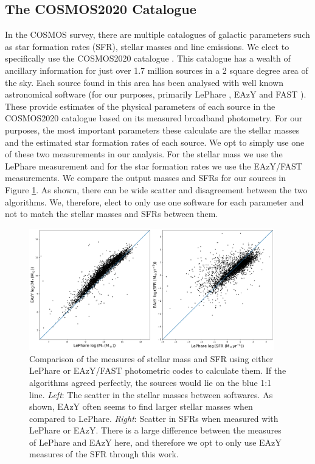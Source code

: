 \subsection{The COSMOS2020 Catalogue}
In the COSMOS survey, there are multiple catalogues of galactic parameters such as star formation rates (SFR), stellar masses and line emissions. We elect to specifically use the COSMOS2020 catalogue \citep{2022ApJS..258...11W}. This catalogue has a wealth of ancillary information for just over 1.7 million sources in a 2 square degree area of the sky. Each source found in this area has been analysed with well known astronomical software (for our purposes, primarily  LePhare \citep{1999MNRAS.310..540A, 2006A&A...457..841I}, EAzY \citep{2008ApJ...686.1503B} and FAST \citep{2017MNRAS.465.3390A}). These provide estimates of the physical parameters of each source in the COSMOS2020 catalogue based on its measured broadband photometry. For our purposes, the most important parameters these calculate are the stellar masses and the estimated star formation rates of each source. We opt to simply use one of these two measurements in our analysis. For the stellar mass we use the LePhare measurement and for the star formation rates we use the EAzY/FAST measurements. We compare the output masses and SFRs for our sources in Figure \ref{fig:difference-measures}. As shown, there can be wide scatter and disagreement between the two algorithms. We, therefore, elect to only use one software for each parameter and not to match the stellar masses and SFRs between them.

\begin{figure}
    \centering
    \includegraphics[width=0.95\textwidth]{Chapter3/figures/mass-sfr-scatter.pdf}
    \caption{Comparison of the measures of stellar mass and SFR using either LePhare or EAzY/FAST photometric codes to calculate them. If the algorithms agreed perfectly, the sources would lie on the blue 1:1 line. \textit{Left}: The scatter in the stellar masses between softwares. As shown, EAzY often seems to find larger stellar masses when compared to LePhare. \textit{Right}: Scatter in SFRs when measured with LePhare or EAzY. There is a large difference between the measures of LePhare and EAzY here, and therefore we opt to only use EAzY measures of the SFR through this work.}
    \label{fig:difference-measures}
\end{figure}

